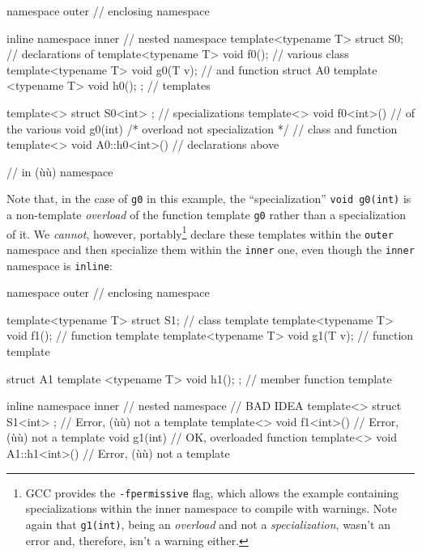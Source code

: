 \begin{emcppslisting}
namespace outer                                          // enclosing namespace
{
    inline namespace inner                               // nested namespace
    {
        template<typename T> struct S0;                  // declarations of
        template<typename T> void f0();                  // various class
        template<typename T> void g0(T v);               // and function
        struct A0 { template <typename T> void h0(); };  // templates
    }

    template<> struct S0<int> { };                       // specializations
    template<> void f0<int>() { }                        // of the various
    void g0(int) { }  /* overload not specialization */  // class and function
    template<> void A0::h0<int>() { }                    // declarations above
}                                                        // in (ù{}ù) namespace
\end{emcppslisting}
    
\noindent Note that, in the case of \lstinline!g0! in this example, the
``specialization'' \lstinline!void!~\lstinline!g0(int)! is a non-template
\emph{overload} of the function template \lstinline!g0! rather than a
specialization of it. We \emph{cannot}, however,
portably{\cprotect\footnote{GCC provides the \lstinline!-fpermissive! flag,
which allows the example containing specializations within the inner
namespace to compile with warnings. Note again that \lstinline!g1(int)!,
being an \emph{overload} and not a \emph{specialization}, wasn't an
  error and, therefore, isn't a warning either.}} declare these
templates within the \lstinline!outer! namespace and then specialize them
within the \lstinline!inner! one, even though the \lstinline!inner! namespace
is \lstinline!inline!:

\begin{emcppslisting}
namespace outer                                     // enclosing namespace
{
    template<typename T> struct S1;                 // class template
    template<typename T> void f1();                 // function template
    template<typename T> void g1(T v);              // function template

    struct A1 { template <typename T> void h1(); }; // member function template

    inline namespace inner                          // nested namespace
    {                                               // BAD IDEA
        template<> struct S1<int> { };              // Error, (ù{}ù) not a template
        template<> void f1<int>() { }               // Error, (ù{}ù) not a template
        void g1(int) { }                            // OK, overloaded function
        template<> void A1::h1<int>() { }           // Error, (ù{}ù) not a template
    }
}
\end{emcppslisting}
    
